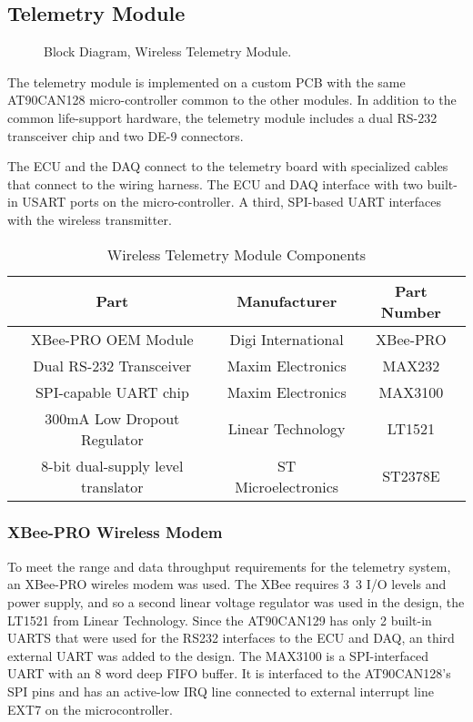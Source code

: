 \subsection{Telemetry Module}

\begin{figure}[H]
\centering

\caption{Block Diagram, Wireless Telemetry Module.\label{fig:tele_tx_overview}}
\end{figure}

The telemetry module is implemented on a custom PCB with the same AT90CAN128 micro-controller common to the other modules. In addition to the common life-support hardware, the telemetry module includes a dual RS-232 transceiver chip and two DE-9 connectors. 

The ECU and the DAQ connect to the telemetry board with specialized cables that connect to the wiring harness. The ECU and DAQ interface with two built-in USART ports on the micro-controller. A third, SPI-based UART interfaces with the wireless transmitter.

\begin{table}[H]
  \caption{Wireless Telemetry Module Components\label{tab:telmetry_module_components}}
  \centering
    \begin{tabular}{|c|c|c|}
      \hline 
      Part & Manufacturer & Part Number\tabularnewline
      \hline
      \hline
      XBee-PRO OEM Module & Digi International & XBee-PRO\tabularnewline
      \hline 
      Dual RS-232 Transceiver & Maxim Electronics & MAX232\tabularnewline
      \hline 
      SPI-capable UART chip & Maxim Electronics & MAX3100\tabularnewline
      \hline 
      300mA Low Dropout Regulator & Linear Technology & LT1521\tabularnewline
      \hline
      8-bit dual-supply level translator & ST Microelectronics & ST2378E\tabularnewline
      \hline
    \end{tabular}
\end{table}


\subsubsection{XBee-PRO Wireless Modem}

To meet the range and data throughput requirements for the telemetry system, an XBee-PRO wireles modem was used. The XBee requires \unit{3.3}{\volt} I/O levels and power supply, and so a second linear voltage regulator was used in the design, the LT1521 from Linear Technology. Since the AT90CAN129 has only 2 built-in UARTS that were used for the RS232 interfaces to the ECU and DAQ, an third external UART was added to the design. The MAX3100 is a SPI-interfaced UART with an 8 word deep FIFO buffer. It is interfaced to the AT90CAN128's SPI pins and has an active-low IRQ line connected to external interrupt line EXT7 on the microcontroller. 

